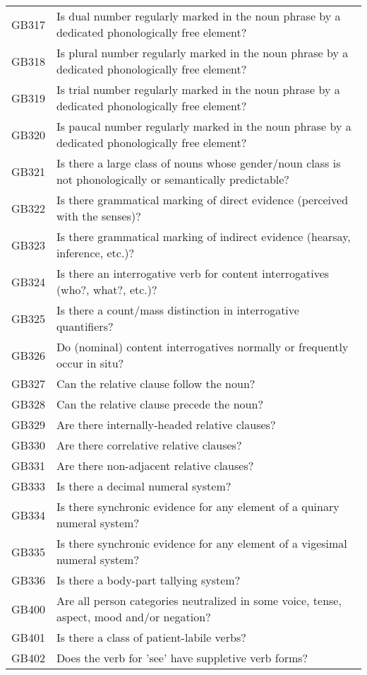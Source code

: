 \begin{longtable}{p{3cm}p{12cm}}
  GB317 & Is dual number regularly marked in the noun phrase by a dedicated phonologically free element? \\ 
  GB318 & Is plural number regularly marked in the noun phrase by a dedicated phonologically free element? \\ 
  GB319 & Is trial number regularly marked in the noun phrase by a dedicated phonologically free element? \\ 
  GB320 & Is paucal number regularly marked in the noun phrase by a dedicated phonologically free element? \\ 
  GB321 & Is there a large class of nouns whose gender/noun class is not phonologically or semantically predictable? \\ 
  GB322 & Is there grammatical marking of direct evidence (perceived with the senses)? \\ 
  GB323 & Is there grammatical marking of indirect evidence (hearsay, inference, etc.)? \\ 
  GB324 & Is there an interrogative verb for content interrogatives (who?, what?, etc.)? \\ 
  GB325 & Is there a count/mass distinction in interrogative quantifiers? \\ 
  GB326 & Do (nominal) content interrogatives normally or frequently occur in situ? \\ 
  GB327 & Can the relative clause follow the noun? \\ 
  GB328 & Can the relative clause precede the noun? \\ 
  GB329 & Are there internally-headed relative clauses? \\ 
  GB330 & Are there correlative relative clauses? \\ 
  GB331 & Are there non-adjacent relative clauses? \\ 
  GB333 & Is there a decimal numeral system? \\ 
  GB334 & Is there synchronic evidence for any element of a quinary numeral system? \\ 
  GB335 & Is there synchronic evidence for any element of a vigesimal numeral system? \\ 
  GB336 & Is there a body-part tallying system? \\ 
  GB400 & Are all person categories neutralized in some voice, tense, aspect, mood and/or negation? \\ 
  GB401 & Is there a class of patient-labile verbs? \\ 
  GB402 & Does the verb for 'see' have suppletive verb forms? \\ 

\end{longtable}
